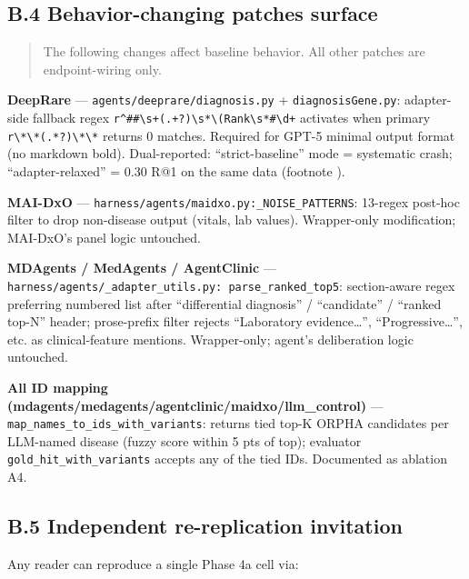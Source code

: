 \subsection{B.4 Behavior-changing patches surface}\label{b.4-behavior-changing-patches-surface}

\begin{quote}
The following changes affect baseline behavior. All other patches
are endpoint-wiring only.
\end{quote}

\textbf{DeepRare} --- \texttt{agents/deeprare/diagnosis.py} + \texttt{diagnosisGene.py}:
adapter-side fallback regex \texttt{r\textquotesingle{}\^{}\#\#\textbackslash{}s+(.+?)\textbackslash{}s*\textbackslash{}(Rank\textbackslash{}s*\#\textbackslash{}d+\textquotesingle{}} activates
when primary \texttt{r\textquotesingle{}\textbackslash{}*\textbackslash{}*(.*?)\textbackslash{}*\textbackslash{}*\textquotesingle{}} returns 0 matches. Required for GPT-5
minimal output format (no markdown bold). Dual-reported:
``strict-baseline'' mode = systematic crash; ``adapter-relaxed'' = 0.30
R@1 on the same data (footnote ).

\textbf{MAI-DxO} --- \texttt{harness/agents/maidxo.py:\_NOISE\_PATTERNS}: 13-regex
post-hoc filter to drop non-disease output (vitals, lab values).
Wrapper-only modification; MAI-DxO's panel logic untouched.

\textbf{MDAgents / MedAgents / AgentClinic} --- \texttt{harness/agents/\_adapter\_utils.py:\ parse\_ranked\_top5}: section-aware regex preferring numbered list
after ``differential diagnosis'' / ``candidate'' / ``ranked top-N'' header;
prose-prefix filter rejects ``Laboratory evidence\ldots{}'', ``Progressive\ldots{}'',
etc. as clinical-feature mentions. Wrapper-only; agent's deliberation
logic untouched.

\textbf{All ID mapping (mdagents/medagents/agentclinic/maidxo/llm\_control)} ---
\texttt{map\_names\_to\_ids\_with\_variants}: returns tied top-K ORPHA candidates
per LLM-named disease (fuzzy score within 5 pts of top); evaluator
\texttt{gold\_hit\_with\_variants} accepts any of the tied IDs. Documented as ablation A4.

\subsection{B.5 Independent re-replication invitation}\label{b.5-independent-re-replication-invitation}

Any reader can reproduce a single Phase 4a cell via:

